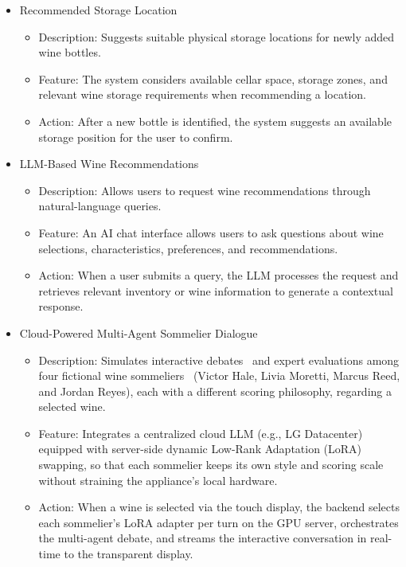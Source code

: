 \documentclass[conference]{IEEEtran}
\begin{document}
\begin{itemize}
    \item Recommended Storage Location
    \begin{itemize}
        \item Description: Suggests suitable physical storage locations for newly added wine bottles.
        \item Feature: The system considers available cellar space, storage zones, and relevant wine storage requirements when recommending a location.
        \item Action: After a new bottle is identified, the system suggests an available storage position for the user to confirm.
    \end{itemize}

    \item LLM-Based Wine Recommendations
    \begin{itemize}
        \item Description: Allows users to request wine recommendations through natural-language queries.
        \item Feature: An AI chat interface allows users to ask questions about wine selections, characteristics, preferences, and recommendations.
        \item Action: When a user submits a query, the LLM processes the request and retrieves relevant inventory or wine information to generate a contextual response.
    \end{itemize}

    \item Cloud-Powered Multi-Agent Sommelier Dialogue
    \begin{itemize}
        \item Description: Simulates interactive debates~\cite{debate} and expert evaluations among four fictional wine sommeliers~\cite{roleplay} (Victor Hale, Livia Moretti, Marcus Reed, and Jordan Reyes), each with a different scoring philosophy, regarding a selected wine.
        \item Feature: Integrates a centralized cloud LLM (e.g., LG Datacenter) equipped with server-side dynamic Low-Rank Adaptation (LoRA) swapping, so that each sommelier keeps its own style and scoring scale without straining the appliance's local hardware.
        \item Action: When a wine is selected via the touch display, the backend selects each sommelier's LoRA adapter per turn on the GPU server, orchestrates the multi-agent debate, and streams the interactive conversation in real-time to the transparent display.
    \end{itemize}


\end{itemize}
\end{document}
